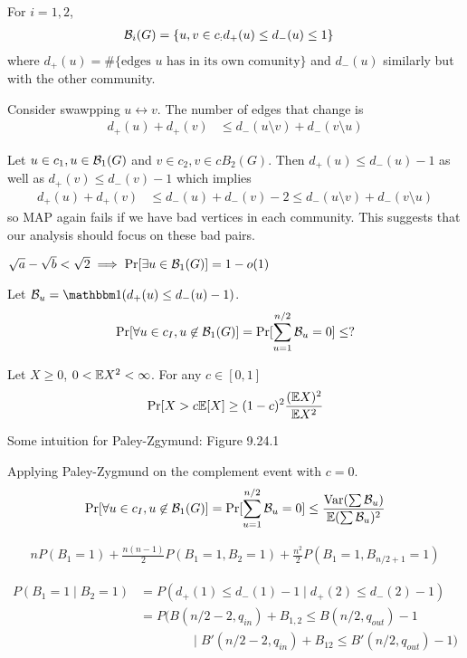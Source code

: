\begin{definition}
  For $i=1,2$,
  \begin{align}
    \mathcal{B}_i(G) &= \{u,v \in c_ : d_+(u) \leq d_-(u) \leq 1 \}
  \end{align}
  where $d_+(u) = \#\{\text{edges $u$ has in its own comunity}\}$
  and $d_-(u)$ similarly but with the other community.
\end{definition}

Consider swawpping $u \leftrightarrow v$. The number of edges that change
is
\begin{align}
  d_+(u) + d_+(v)
  &\leq d_-(u \setminus v) + d_-(v \setminus u)
\end{align}

Let $u \in c_1, u \in \mathcal{B}_1(G)$ and $v \in c_2, v \in cB_2(G)$.
Then $d_+(u) \leq d_-(u) - 1$ as well as
$d_+(v) \leq d_-(v) - 1$ which implies
\begin{align}
  d_+(u) + d_+(v)
  &\leq d_-(u) + d_-(v) - 2
  \leq d_-(u \setminus v) + d_-(v \setminus u)
\end{align}
so MAP again fails if we have bad vertices in each community.
This suggests that our analysis should focus on these bad pairs.

\begin{lemma}
  $\sqrt{a} - \sqrt{b} < \sqrt{2} \implies \Pr[\exists u \in \mathcal{B}_1(G)] = 1 - o(1)$
\end{lemma}

Let $\cB_u = \ind(d_+(u) \leq d_-(u) - 1)$.
\begin{align}
  \Pr[\forall u \in c_I, u \not\in \mathcal{B}_1(G)]
  = \Pr[ \sum_{u=1}^{n/2} \mathcal{B}_u = 0 ]
  \leq ?
\end{align}

\begin{theorem}
  Let $X \geq 0$, $0 < \mathbb{E} X^2 < \infty$.
  For any $c \in [0,1]$
  \begin{align}
    \Pr[X > c \mathbb{E}[X] \geq (1 - c)^2 \frac{(\mathbb{E} X)^2}{\mathbb{E} X^2}
  \end{align}
\end{theorem}

Some intuition for Paley-Zgymund: Figure 9.24.1

Applying Paley-Zygmund on the complement event with $c=0$.
\begin{align}
  \Pr[\forall u \in c_I, u \not\in \mathcal{B}_1(G)]
  = \Pr[ \sum_{u=1}^{n/2} \mathcal{B}_u = 0 ]
  \leq \frac{\operatorname{Var}(\sum \mathcal{B}_u)}{\mathbb{E} (\sum \mathcal{B}_u)^2}
\end{align}

\begin{align}
  n P(B_1 = 1) + \frac{n (n-1)}{2} P(B_1 = 1, B_2 = 1)
  + \frac{n^2}{2} P(B_1 = 1, B_{n/2 + 1} = 1)
\end{align}

\begin{align}
  P(B_1 = 1 \mid B_2 = 1)
  &= P(d_+(1) \leq d_-(1) - 1 \mid d_+(2) \leq d_-(2) - 1) \\
  &= P( B(n/2-2, q_{in}) + B_{1,2} \leq B(n/2, q_{out}) - 1 \\
  &\qquad\qquad \mid B'(n/2 - 2, q_{in}) + B_{12} \leq B'(n/2, q_{out}) - 1 )
\end{align}
